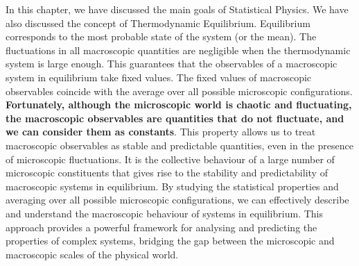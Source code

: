 \documentclass[12pt,a4paper]{report}
\begin{document}
In this chapter, we have discussed the main goals of Statistical Physics. We have also discussed the concept of Thermodynamic Equilibrium. Equilibrium corresponds to the most probable state of the system (or the mean). The fluctuations in all macroscopic quantities are negligible when the thermodynamic system is large enough. This
guarantees that the observables of a macroscopic system in equilibrium take fixed values. The fixed values
of macroscopic observables coincide with the average over all possible microscopic configurations. \textbf{Fortunately, although the microscopic world is chaotic and fluctuating, the macroscopic observables are quantities that do not fluctuate, and we can consider them as constants}. This property allows us to treat macroscopic observables as stable and predictable quantities, even in the presence of microscopic fluctuations. It is the collective behaviour of a large number of microscopic constituents that gives rise to the stability and predictability of macroscopic systems in equilibrium. By studying the statistical properties
and averaging over all possible microscopic configurations, we can effectively describe and understand the
macroscopic behaviour of systems in equilibrium. This approach provides a powerful framework for analysing
and predicting the properties of complex systems, bridging the gap between the microscopic and macroscopic
scales of the physical world.

\printbibliography[title={Bibliografía}]
\end{document}
